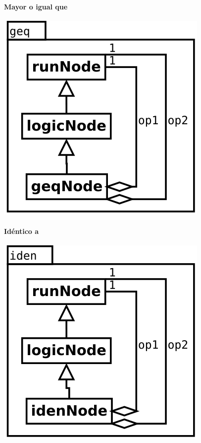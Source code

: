 \paragraph {Mayor o igual que}
\begin{center}
\includegraphics[scale=0.4]{geq.png} \\
\end{center}


\paragraph {Idéntico a}
\begin{center}
\includegraphics[scale=0.4]{iden.png} \\
\end{center}

